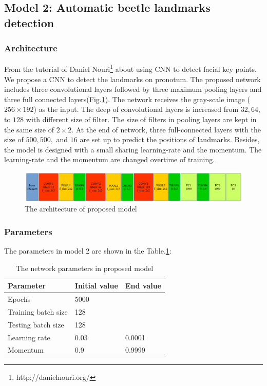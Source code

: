 \documentclass[12pt,a4paper]{article}
\begin{document}
\subsection{Model 2: Automatic beetle landmarks detection}
\subsubsection{Architecture}
From the tutorial of Daniel Nouri\footnote{http://danielnouri.org/} about using CNN to detect facial key points. We propose a CNN to detect the landmarks on pronotum. The proposed network includes three convolutional layers followed by three maximum pooling layers and three full connected layers(Fig.\ref{pmodel}). The network receives the gray-scale image ($256 \times 192$) as the input. The deep of convolutional layers is increased from $32, 64, $ to $ 128$ with different size of filter. The size of filters in pooling layers are kept in the same size of $2 \times 2$. At the end of network, three full-connected layers with the size of $500, 500, $ and $16$ are set up to predict the positions of landmarks. Besides, the model is designed with a small sharing learning-rate and the momentum. The learning-rate and the momentum are changed overtime of training.
\begin{figure}[h!]
	\centering
	\includegraphics[scale=0.45]{images/model3}
	\caption{The architecture of proposed model}
	\label{pmodel}
\end{figure}
\subsubsection{Parameters}
The parameters in model 2 are shown in the Table.\ref{model2parameters}:
\begin{table}[h!]
	\centering
	\begin{tabular}{l l l}
	Parameter & Initial value & End value \\ \hline
	Epochs & 5000 &  \\ \hline
	Training batch size & 128 & \\ \hline
	Testing batch size & 128 & \\ \hline
	Learning rate & 0.03 & 0.0001 \\ \hline
	Momentum & 0.9 & 0.9999 \\ \hline
	\end{tabular}
	\caption{The network parameters in proposed model}
	\label{model2parameters}
\end{table}
\end{document}
